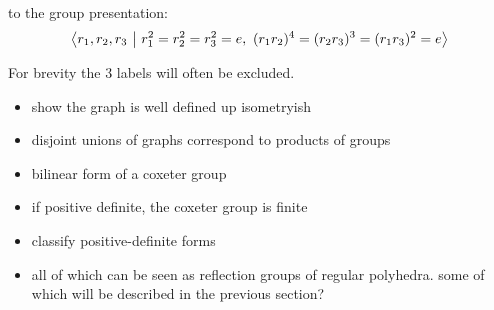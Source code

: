 \documentclass[../main.tex]{subfiles}
\begin{document}
to the group presentation: \[
\left\langle r_1,r_2,r_3 \ \middle| \ r_1^2 = r_2^2 = r_3^2 = e, \ (r_1r_2)^4 = (r_2r_3)^3 = (r_1r_3)^2 = e \right\rangle
\]

For brevity the $3$ labels will often  be excluded.

\begin{itemize}
    \item show the graph is well defined up isometryish
    \item disjoint unions of graphs correspond to products of groups
    \item bilinear form of a coxeter group
    \item if positive definite, the coxeter group is finite
    \item classify positive-definite forms
    \item all of which can be seen as reflection groups of regular polyhedra. some of which will be described in the previous section?
\end{itemize}
\end{document}
